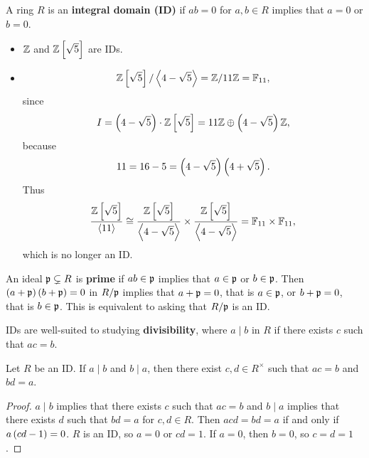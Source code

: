 
\begin{definition}
A ring $ R $ is an \textbf{integral domain (ID)} if $ ab = 0 $ for $ a, b \in R $ implies that $ a = 0 $ or $ b = 0 $.
\end{definition}

\begin{example*}
\hfill
\begin{itemize}
\item $ \mathbb{Z} $ and $ \Z\sbr{\sqrt{5}} $ are IDs.
\item
$$ \Z\sbr{\sqrt{5}} / \abr{4 - \sqrt{5}} = \Z / 11\Z = \F_{11}, $$
since
$$ I = \br{4 - \sqrt{5}} \cdot \Z\sbr{\sqrt{5}} = 11\Z \oplus \br{4 - \sqrt{5}}\Z, $$
because
$$ 11 = 16 - 5 = \br{4 - \sqrt{5}}\br{4 + \sqrt{5}}. $$
Thus
$$ \dfrac{\Z\sbr{\sqrt{5}}}{\abr{11}} \cong \dfrac{\Z\sbr{\sqrt{5}}}{\abr{4 - \sqrt{5}}} \times \dfrac{\Z\sbr{\sqrt{5}}}{\abr{4 - \sqrt{5}}} = \F_{11} \times \F_{11}, $$
which is no longer an ID.
\end{itemize}
\end{example*}

\begin{remark*}
An ideal $ \mathfrak{p} \subsetneq R $ is \textbf{prime} if $ ab \in \mathfrak{p} $ implies that $ a \in \mathfrak{p} $ or $ b \in \mathfrak{p} $. Then $ \br{a + \pp}\br{b + \pp} = 0 $ in $ R / \mathfrak{p} $ implies that $ a + \mathfrak{p} = 0 $, that is $ a \in \mathfrak{p} $, or $ b + \mathfrak{p} = 0 $, that is $ b \in \mathfrak{p} $. This is equivalent to asking that $ R / \mathfrak{p} $ is an ID.
\end{remark*}

IDs are well-suited to studying \textbf{divisibility}, where $ a \mid b $ in $ R $ if there exists $ c $ such that $ ac = b $.

\begin{lemma}
Let $ R $ be an ID. If $ a \mid b $ and $ b \mid a $, then there exist $ c, d \in R^\times $ such that $ ac = b $ and $ bd = a $.
\end{lemma}

\begin{proof}
$ a \mid b $ implies that there exists $ c $ such that $ ac = b $ and $ b \mid a $ implies that there exists $ d $ such that $ bd = a $ for $ c, d \in R $. Then $ acd = bd = a $ if and only if $ a\br{cd - 1} = 0 $. $ R $ is an ID, so $ a = 0 $ or $ cd = 1 $. If $ a = 0 $, then $ b = 0 $, so $ c = d = 1 $.
\end{proof}

